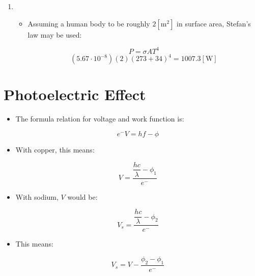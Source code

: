 \begin{enumerate}
\begin{enumerate}
\begin{itemize}
        \end{itemize}

      \item

        \begin{itemize}

          \item Assuming a human body to be roughly $2[\si{\meter\squared}]$ in surface area, Stefan's law may be used:

            $$P=\sigma AT^4$$
            $$\left( 5.67\cdot10^{-8} \right)(2)(273+34)^4=1007.3[\si{\watt}]$$

        \end{itemize}

    \end{enumerate}

    \section*{Photoelectric Effect}

    \begin{itemize}

      \item The formula relation for voltage and work function is:

        $$e^-V=hf-\phi$$

      \item With copper, this means:

        $$V=\dfrac{\dfrac{hc}{\lambda}-\phi_1}{e^-}$$

      \item With sodium, $V$ would be:

        $$V_s=\dfrac{\dfrac{hc}{\lambda}-\phi_2}{e^-}$$

      \item This means:

        $$V_s=V - \dfrac{\phi_2-\phi_1}{e^-}$$

    \end{itemize}

\end{enumerate}



